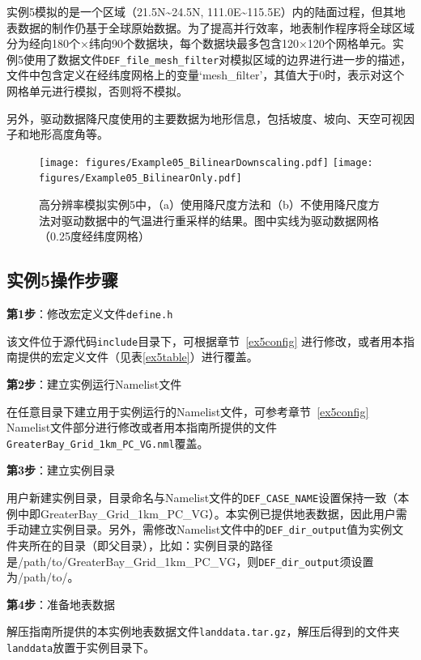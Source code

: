 实例5模拟的是一个区域（21.5\textdegree N\textasciitilde 24.5\textdegree N, 111.0\textdegree E\textasciitilde 115.5\textdegree E）内的陆面过程，但其地表数据的制作仍基于全球原始数据。为了提高并行效率，地表制作程序将全球区域分为经向180个×纬向90个数据块，每个数据块最多包含120×120个网格单元。实例5使用了数据文件\texttt{DEF\_file\_mesh\_filter}对模拟区域的边界进行进一步的描述，文件中包含定义在经纬度网格上的变量`mesh\_filter'，其值大于0时，表示对这个网格单元进行模拟，否则将不模拟。

另外，驱动数据降尺度使用的主要数据为地形信息，包括坡度、坡向、天空可视因子和地形高度角等。

\begin{figure}[htpb]
    \centering
    \texttt{[image: figures/Example05\_BilinearDownscaling.pdf]}
    \texttt{[image: figures/Example05\_BilinearOnly.pdf]}
    \caption{高分辨率模拟实例5中，（a）使用降尺度方法和（b）不使用降尺度方法对驱动数据中的气温进行重采样的结果。图中实线为驱动数据网格（0.25度经纬度网格）}
    \label{fig:fig_hiresdownscaling}
\end{figure}

\subsection{实例5操作步骤}

\textbf{第1步}：修改宏定义文件\texttt{define.h}

该文件位于源代码\texttt{include}目录下，可根据章节~\ref{ex5config} 进行修改，或者用本指南提供的宏定义文件（见表\ref{ex5table}）进行覆盖。

\bigskip
\textbf{第2步}：建立实例运行Namelist文件

在任意目录下建立用于实例运行的Namelist文件，可参考章节~\ref{ex5config} Namelist文件部分进行修改或者用本指南所提供的文件\texttt{GreaterBay\_Grid\_1km\_PC\_VG.nml}覆盖。

\bigskip
\textbf{第3步}：建立实例目录

用户新建实例目录，目录命名与Namelist文件的\texttt{DEF\_CASE\_NAME}设置保持一致（本例中即GreaterBay\_Grid\_1km\_PC\_VG）。本实例已提供地表数据，因此用户需手动建立实例目录。另外，需修改Namelist文件中的\texttt{DEF\_dir\_output}值为实例文件夹所在的目录（即父目录），比如：实例目录的路径是/path/to/GreaterBay\_Grid\_1km\_PC\_VG，则\texttt{DEF\_dir\_output}须设置为/path/to/。

\bigskip
\textbf{第4步}：准备地表数据

解压指南所提供的本实例地表数据文件\texttt{landdata.tar.gz}，解压后得到的文件夹\texttt{landdata}放置于实例目录下。

